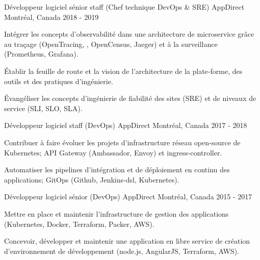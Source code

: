 \begin{cventries}
  \cventry
    {Développeur logiciel sénior staff (Chef technique DevOps \& SRE)} %
    {AppDirect} %
    {Montréal, Canada} %
    {2018 - 2019} %
    {
      \begin{cvitems} %
        \item {Intégrer les concepts d'observabilité dans une architecture de microservice grâce au traçage (OpenTracing, , OpenCensus, Jaeger) et à la surveillance (Prometheus, Grafana).}
        \item {Établir la feuille de route et la vision de l'architecture de la plate-forme, des outils et des pratiques d'ingénierie.}
        \item {Évangéliser les concepts d'ingénierie de fiabilité des sites (SRE) et de niveaux de service (SLI, SLO, SLA).}
      \end{cvitems}
    }

  \cventry
    {Développeur logiciel staff (DevOps)} %
    {AppDirect} %
    {Montréal, Canada} %
    {2017 - 2018} %
    {
      \begin{cvitems} %
        \item {Contribuer à faire évoluer les projets d'infrastructure réseau open-source de Kubernetes; API Gateway (Ambassador, Envoy) et ingress-controller.}
        \item {Automatiser les pipelines d'intégration et de déploiement en continu des applications; GitOps (Github, Jenkins-dsl, Kubernetes).}
      \end{cvitems}
    }

  \cventry
    {Développeur logiciel sénior (DevOps)} %
    {AppDirect} %
    {Montréal, Canada} %
    {2015 - 2017} %
    {
      \begin{cvitems} %
        \item {Mettre en place et maintenir l'infrastructure de gestion des applications (Kubernetes, Docker, Terraform, Packer, AWS).}
        \item {Concevoir, développer et maintenir une application en libre service de création d'environnement de développement (node.js, AngularJS, Terraform, AWS).}
      \end{cvitems}
    }


\end{cventries}
